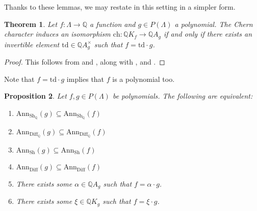\documentclass[oneside]{amsart}
\theoremstyle{plain}
\newtheorem{theorem}{Theorem}[section]
\newtheorem{proposition}[theorem]{Proposition}
\theoremstyle{definition}
\newcommand{\Q}{{\mathbb{Q}}}
\newcommand{\Ann}{{\mathrm{Ann}}}
\newcommand{\Diff}{{\mathrm{Diff}}}
\newcommand{\Sh}{{\mathrm{Sh}}}
\newcommand{\ch}{{\mathrm{ch}}}
\newcommand{\td}{{\mathrm{td}}}
\begin{document}
Thanks to these lemmas, we may restate  in this setting in a simpler form.

\begin{theorem}
\label{thm:ch-descends-iff-todd}
    Let $f : \Lambda \to \Q$ a function and $g \in P(\Lambda)$ a polynomial.
    The Chern character induces an isomorphism $\ch: \Q K_f \to \Q A_g$ if and only if there exists an invertible element $\td \in \Q A_g^\times$ such that $f = \td \cdot g$.
\end{theorem}

\begin{proof}
    This follows from  and , along with , and .
\end{proof}

Note that $f = \td \cdot g$ implies that $f$ is a polynomial too.

\begin{proposition}\label{prop:polynomial-equivalence-inclusion}
    Let $f, g \in P(\Lambda)$ be polynomials.
    The following are equivalent:
    \begin{enumerate}
        \item $\Ann_{\Sh_\Q}(g) \subseteq \Ann_{\Sh_\Q}(f)$
        \item $\Ann_{\Diff_\Q}(g) \subseteq \Ann_{\Diff_\Q}(f)$
        \item $\Ann_{\Sh}(g) \subseteq \Ann_{\Sh}(f)$
        \item $\Ann_{\Diff}(g) \subseteq \Ann_{\Diff}(f)$
        \item There exists some $\alpha \in \Q A_g$ such that $f = \alpha \cdot g$.
        \item There exists some $\xi \in \Q K_g$ such that $f = \xi \cdot g$.
    \end{enumerate}
\end{proposition}
\end{document}
